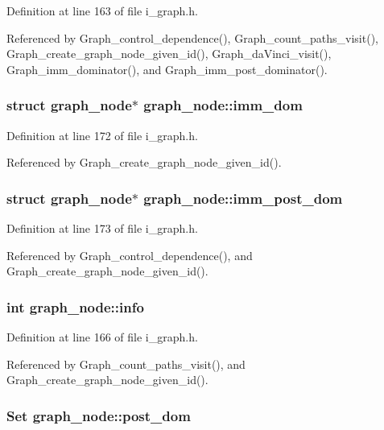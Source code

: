 Definition at line 163 of file i\_\-graph.h.

Referenced by Graph\_\-control\_\-dependence(), Graph\_\-count\_\-paths\_\-visit(), Graph\_\-create\_\-graph\_\-node\_\-given\_\-id(), Graph\_\-da\-Vinci\_\-visit(), Graph\_\-imm\_\-dominator(), and Graph\_\-imm\_\-post\_\-dominator().
\subsubsection{\setlength{\rightskip}{0pt plus 5cm}struct \bf{graph\_\-node}$\ast$ \bf{graph\_\-node::imm\_\-dom}}\label{structgraph__node_9f7c3c25c876b417426ab71145e130b5}




Definition at line 172 of file i\_\-graph.h.

Referenced by Graph\_\-create\_\-graph\_\-node\_\-given\_\-id().
\subsubsection{\setlength{\rightskip}{0pt plus 5cm}struct \bf{graph\_\-node}$\ast$ \bf{graph\_\-node::imm\_\-post\_\-dom}}\label{structgraph__node_a62d11491a396043bcaeec05e12e792d}




Definition at line 173 of file i\_\-graph.h.

Referenced by Graph\_\-control\_\-dependence(), and Graph\_\-create\_\-graph\_\-node\_\-given\_\-id().
\subsubsection{\setlength{\rightskip}{0pt plus 5cm}int \bf{graph\_\-node::info}}\label{structgraph__node_fc0412ffe208606572fc65f85763f3a5}




Definition at line 166 of file i\_\-graph.h.

Referenced by Graph\_\-count\_\-paths\_\-visit(), and Graph\_\-create\_\-graph\_\-node\_\-given\_\-id().
\subsubsection{\setlength{\rightskip}{0pt plus 5cm}\bf{Set} \bf{graph\_\-node::post\_\-dom}}\label{structgraph__node_ef6eb059f8361834ce28b9d22d1b3da1}




